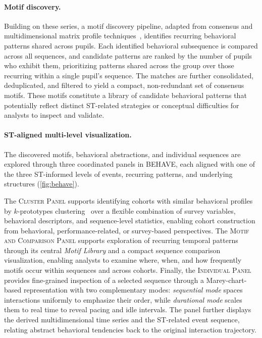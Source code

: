 \paragraph{Motif discovery.}
Building on these series, a motif discovery pipeline, adapted from consensus and multidimensional matrix profile techniques~\cite{kamgar2019matrix, yeh2017matrix}, identifies recurring behavioral patterns shared across pupils.
Each identified behavioral subsequence is compared across all sequences, and candidate patterns are ranked by the number of pupils who exhibit them, prioritizing patterns shared across the group over those recurring within a single pupil's sequence.
The matches are further consolidated, deduplicated, and filtered to yield a compact, non-redundant set of consensus motifs.
These motifs constitute a library of candidate behavioral patterns that potentially reflect distinct ST-related strategies or conceptual difficulties for analysts to inspect and validate.


\paragraph{ST-aligned multi-level visualization.}
The discovered motifs, behavioral abstractions, and individual sequences are explored through three coordinated panels in \textsc{BEHAVE}, each aligned with one of the three ST-informed levels of events, recurring patterns, and underlying structures (\cref{fig:behave}).

The \textsc{Cluster Panel} supports identifying cohorts with similar behavioral profiles by $k$-prototypes clustering~\cite{huang1998extensions} over a flexible combination of survey variables, behavioral descriptors, and sequence-level statistics, enabling cohort construction from behavioral, performance-related, or survey-based perspectives.
The \textsc{Motif and Comparison Panel} supports exploration of recurring temporal patterns through its central \textit{Motif Library} and a compact sequence comparison visualization, enabling analysts to examine where, when, and how frequently motifs occur within sequences and across cohorts.
Finally, the \textsc{Individual Panel} provides fine-grained inspection of a selected sequence through a Marey-chart-based representation with two complementary modes: \textit{sequential mode} spaces interactions uniformly to emphasize their order, while \textit{durational mode} scales them to real time to reveal pacing and idle intervals.
The panel further displays the derived multidimensional time series and the ST-related event sequence, relating abstract behavioral tendencies back to the original interaction trajectory.

